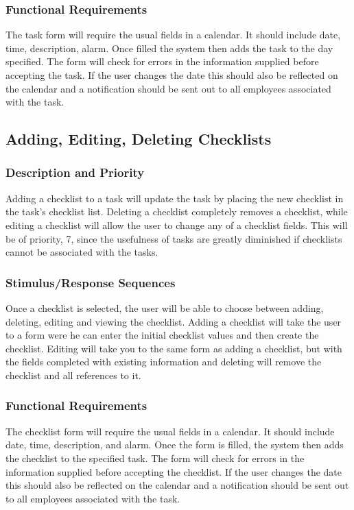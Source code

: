 \documentclass{article}
\begin{document}
\subsubsection{Functional Requirements}
The task form will require the usual fields in a calendar. 
It should include date, time, description, alarm. 
Once filled the system then adds the task to the day specified. 
The form will check for errors in the information supplied before accepting the task. 
If the user changes the date this should also be reflected on the calendar and a notification should be sent out to all employees associated with the task.

\subsection{Adding, Editing, Deleting Checklists}
\subsubsection{Description and Priority} 
Adding a checklist to a task will update the task by placing the new checklist in the task's checklist list. 
Deleting a checklist completely removes a checklist, while editing a checklist will allow the user to change any of a checklist fields. 
This will be of priority, 7, since the usefulness of tasks are greatly diminished if checklists cannot be associated with the tasks.
\subsubsection{Stimulus/Response Sequences}
Once a checklist is selected, the user will be able to choose between adding, deleting, editing and viewing the checklist. 
Adding a checklist will take the user to a form were he can enter the initial checklist values and then create the checklist. 
Editing will take you to the same form as adding a checklist, but with the fields completed with existing information and deleting will remove the checklist and all references to it. 
\subsubsection{Functional Requirements}
The checklist form will require the usual fields in a calendar. 
It should include date, time, description, and alarm. 
Once the form is filled, the system then adds the checklist to the specified task. 
The form will check for errors in the information supplied before accepting the checklist. 
If the user changes the date this should also be reflected on the calendar and a notification should be sent out to all employees associated with the task.
\end{document}
